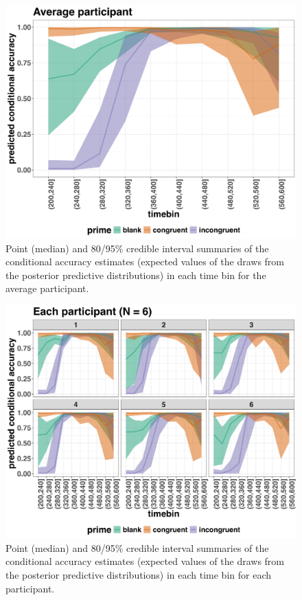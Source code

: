 \documentclass[
  man, donotrepeattitle,floatsintext]{apa6}
\begin{document}
\begin{figure}[H]

{\centering \includegraphics[width=0.8\linewidth,height=0.67\textheight,]{../Tutorial_2_Bayesian/figures/M1i_ca_pred_grand} 

}

\caption{Point (median) and 80/95\% credible interval summaries of the conditional accuracy estimates (expected values of the draws from the posterior predictive distributions) in each time bin for the average participant.}\label{fig:plot-pred-grand-effects-ca}
\end{figure}



\begin{figure}[H]

{\centering \includegraphics[width=0.8\linewidth,height=0.67\textheight,]{../Tutorial_2_Bayesian/figures/M1i_ca_pred_pid} 

}

\caption{Point (median) and 80/95\% credible interval summaries of the conditional accuracy estimates (expected values of the draws from the posterior predictive distributions) in each time bin for each participant.}\label{fig:plot-pred-pid-effects-ca}
\end{figure}
\end{document}
